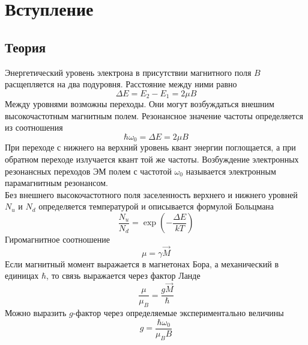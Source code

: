 \documentclass[14pt, a4paper]{extarticle}
\begin{document}
\section{Вступление}
\subsection{Теория}
Энергетический уровень электрона в присутствии магнитного поля $B$ расщепляется
на два подуровня. Расстояние между ними равно
\begin{equation}
    \label{eq:(1)}
    \Delta E = E_2 - E_1 = 2 \mu B
\end{equation}
Между уровнями возможны переходы. Они могут возбуждаться внешним высокочастотным
магнитным полем. Резонансное значение частоты определяется из соотношения
\begin{equation}
    \label{eq:(2)}
    \hbar \omega_0 = \Delta E = 2 \mu B
\end{equation}
При переходе с нижнего на верхний уровень квант энергии поглощается, а при
обратном переходе излучается квант той же частоты. Возбуждение электронных
резонансных переходов ЭМ полем с частотой $\omega_0$ называется электронным
парамагнитным резонансом.
\\
Без внешнего высокочастотного поля заселенность верхнего и нижнего уровней $N_u$
и $N_d$ определяется температурой и описывается формулой Больцмана
\begin{equation}
    \label{eq:(3)}
    \frac{N_u}{N_d} = \exp \left( - \frac{\Delta E}{k T} \right)
\end{equation}
Гиромагнитное соотношение
\begin{equation}
    \label{eq:(4)}
    \mu = \gamma \vec{M}
\end{equation}
Если магнитный момент выражается в магнетонах Бора, а механический в единицах
$\hbar$, то связь выражается через фактор Ланде
\begin{equation}
    \label{eq:(5)}
    \frac{\mu}{\mu_B} = \frac{g \vec{M}}{\hbar}
\end{equation}
Можно выразить $g$-фактор через определяемые экспериментально величины
\begin{equation}
    \label{eq:(6)}
    g = \frac{\hbar \omega_0}{\mu_B B}
\end{equation}
\end{document}
